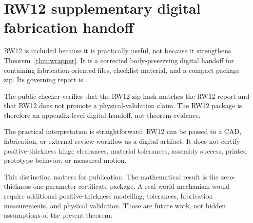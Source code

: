 \section{RW12 supplementary digital fabrication handoff}
\label{sec:rw12}

RW12 is included because it is practically useful, not because it strengthens
Theorem~\ref{thm:wrapper}.  It is a corrected body-preserving digital handoff
for \treeA{} containing fabrication-oriented files, checklist material, and a
compact package zip.  Its governing report is
.

\begin{certprop}
The public checker verifies that the RW12 zip hash matches the RW12 report and
that RW12 does not promote a physical-validation claim.  The RW12 package is
therefore an appendix-level digital handoff, not theorem evidence.
\end{certprop}

The practical interpretation is straightforward: RW12 can be passed to a CAD,
fabrication, or external-review workflow as a digital artifact.  It does not
certify positive-thickness hinge clearances, material tolerances, assembly
success, printed prototype behavior, or measured motion.

\begin{remark}
This distinction matters for publication.  The mathematical result is the
zero-thickness one-parameter certificate package.  A real-world mechanism would
require additional positive-thickness modelling, tolerances, fabrication
measurements, and physical validation.  Those are future work, not hidden
assumptions of the present theorem.
\end{remark}
